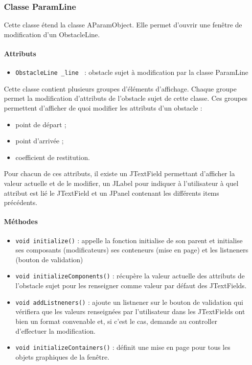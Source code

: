 \documentclass{report}
\begin{document}
\subsubsection{Classe ParamLine}

Cette classe étend la classe AParamObject. Elle permet d'ouvrir une fenêtre de modification d'un ObstacleLine.

\paragraph*{Attributs}
\begin{itemize}
\item \texttt{ObstacleLine \_line } : obstacle sujet à modification par la classe ParamLine
\end{itemize}
Cette classe contient plusieurs groupes d'éléments d'affichage. Chaque groupe permet la modification d'attributs de l'obstacle sujet de cette classe. Ces groupes permettent d'afficher de quoi modifier les attributs d'un obstacle :
\begin{itemize}
\item point de départ ;
\item point d'arrivée ;
\item coefficient de restitution.
\end{itemize}
Pour chacun de ces attributs, il existe un JTextField permettant d'afficher la valeur actuelle et de le modifier, un JLabel pour indiquer à l'utilisateur à quel attribut est lié le JTextField et un JPanel contenant les différents items précédents.

\paragraph*{Méthodes}
\begin{itemize}
\item \texttt{void initialize()} : appelle la fonction initialise de son parent et initialise ses composants (modificateurs) ses conteneurs (mise en page) et les listneners (bouton de validation)
\item \texttt{void initializeComponents()} : récupère la valeur actuelle des attributs de l'obstacle sujet pour les renseigner comme valeur par défaut des JTextFields.
\item \texttt{void addListneners()} : ajoute un listnener sur le bouton de validation qui vérifiera que les valeurs renseignées par l'utilisateur dans les JTextFields ont bien un format convenable et, si c'est le cas, demande au controller d'effectuer la modification.
\item \texttt{void initializeContainers()} : définit une mise en page pour tous les objets graphiques de la fenêtre.
\end{itemize}
\end{document}
